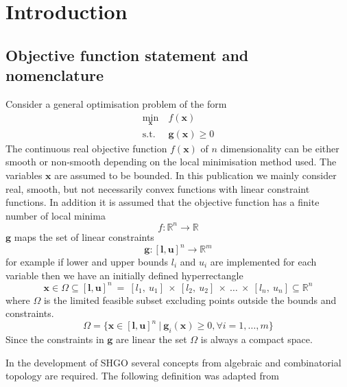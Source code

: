 \chapter{Introduction}
\section{Objective function statement and nomenclature}
Consider a general optimisation problem of the form
\begin{align} \nonumber
\underset{\mathbf{x}}{\textrm{min}} ~&f (\mathbf{x}) \\
\textrm{s.t.}~ &\mathbf{g} (\mathbf{x}) \geq 0
\end{align}
The continuous real objective function $f(\mathbf{x})$ of $n$ dimensionality can be either smooth or non-smooth depending on the local minimisation method used. The variables $\mathbf{x}$ are assumed to be bounded. In this publication we mainly consider real, smooth, but not necessarily convex functions with linear constraint functions. In addition it is assumed that the objective function has a finite number of local minima
\begin{equation} \label{eq:objfun}
f : \mathbb{R}^n \rightarrow \mathbb{R}
\end{equation}
$\mathbf{g}$ maps the set of linear constraints
\begin{equation} \label{eq:gcons}
\mathbf{g} :  [\mathbf{l}, \mathbf{u}]^n  \rightarrow \mathbb{R}^m
\end{equation}
for example if lower and upper bounds $l_i$ and $u_i$ are implemented for each variable then we have an initially defined hyperrectangle 
\begin{equation}
\mathbf{x} \in \Omega \subseteq  [\mathbf{l}, \mathbf{u}]^n~=~[l_1,~u_1]~\times~[l_2,~u_2] ~\times~\dots~\times~[l_n,~u_n] \subseteq  \mathbb{R}^n
\end{equation}
 where $\Omega$ is the limited feasible subset excluding points outside the bounds and constraints. 
\begin{equation} \label{eq:omega}
\Omega = \{ \mathbf{x} \in   [\mathbf{l}, \mathbf{u}]^n ~|~ \mathbf{g}_i (\mathbf{x} ) \geq 0, \forall i =1, \dots, m\}
\end{equation}
Since the constraints in $\mathbf{g}$ are linear the set $\Omega$ is always a compact space.

In the development of SHGO several concepts from algebraic and combinatorial topology \cite{Henle1979} are required. The following definition was adapted from \citet[p. 9]{Hatcher2011} 

